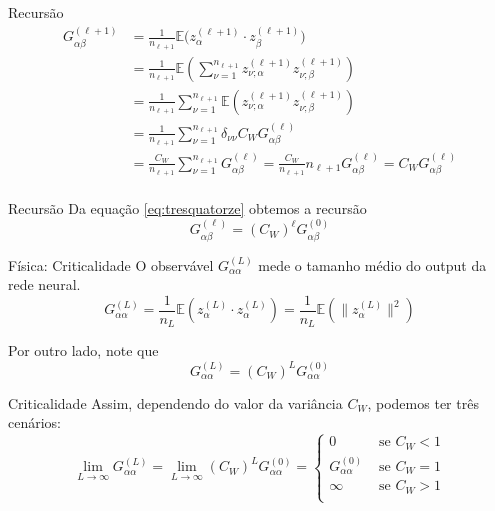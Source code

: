 \documentclass{beamer}
\newcommand{\EE}{\mathbb{E}}
\newcommand{\aaA}{\alpha}
\newcommand{\aaB}{\beta}
\begin{document}
\begin{frame}{Recursão}
	\begin{align*}\tag{3.14}\label{eq:tresquatorze}
		G^{(\ell+1)}_{\aaA\aaB} &= \frac{1}{n_{\ell+1}}\EE\big(z^{(\ell+1)}_{\aaA}\cdot z^{(\ell+1)}_{\aaB}\big) \\
		&= \frac{1}{n_{\ell+1}}\EE\left(\sum_{\nu=1}^{n_{\ell+1}}z^{(\ell+1)}_{\nu;\aaA} z^{(\ell+1)}_{\nu;\aaB}\right) \\
		&= \frac{1}{n_{\ell+1}}\sum_{\nu=1}^{n_{\ell+1}} \EE\left(z^{(\ell+1)}_{\nu;\aaA} z^{(\ell+1)}_{\nu;\aaB}\right) \\
		&= \frac{1}{n_{\ell+1}}\sum_{\nu=1}^{n_{\ell+1}} \delta_{\nu\nu}C_WG^{(\ell)}_{\aaA\aaB} \\
		&= \frac{C_W}{n_{\ell+1}}\sum_{\nu=1}^{n_{\ell+1}} G^{(\ell)}_{\aaA\aaB} = \frac{C_W}{n_{\ell+1}}n_{\ell+1}G^{(\ell)}_{\aaA\aaB} = C_WG^{(\ell)}_{\aaA\aaB}\\ 
	\end{align*}
\end{frame}

\begin{frame}{Recursão}
	Da equação \eqref{eq:tresquatorze} obtemos a recursão
	\begin{equation*}\tag{3.15}\label{eq:trezquinze}
		G^{(\ell)}_{\aaA\aaB} = (C_W)^{\ell}G^{(0)}_{\aaA\aaB}
	\end{equation*}
\end{frame}

\begin{frame}{Física: Criticalidade}
	O observável $G^{(L)}_{\aaA\aaA}$ mede o tamanho médio do output da rede neural.
	\begin{equation*}\tag{3.16}
		G^{(L)}_{\aaA\aaA} = \frac{1}{n_L}\EE\left(z^{(L)}_\aaA\cdot z^{(L)}_\aaA\right) =  \frac{1}{n_L}\EE\left(\big\|z^{(L)}_\aaA\big\|^2\right)
	\end{equation*}

	Por outro lado, note que 
	$$G^{(L)}_{\aaA\aaA} = (C_W)^LG^{(0)}_{\aaA\aaA}$$
\end{frame}

\begin{frame}{Criticalidade}
	Assim, dependendo do valor da variância $C_W$, podemos ter três cenários:
	\begin{equation*}
		\lim_{L\to\infty} G^{(L)}_{\aaA\aaA} = \lim_{L\to\infty} (C_W)^LG^{(0)}_{\aaA\aaA} =
	\begin{cases}
		0  &\text{ se } C_W < 1  \\
		G^{(0)}_{\aaA\aaA}&\text{ se }  C_W = 1 \\
		\infty &\text{ se  } C_W>1\\
	\end{cases}
	\end{equation*}
\end{frame}
\end{document}
